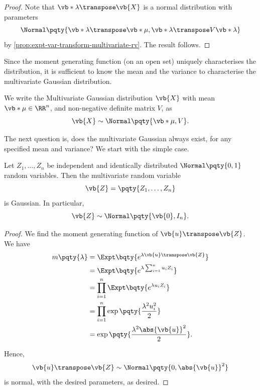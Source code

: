\begin{proof}
    Note that \(\vb*{\lambda \transpose \vb{X}}\) is a normal distribution with parameters
    \[
        \Normal\pqty{\vb*{\lambda}\transpose\vb*{\mu}, \vb*{\lambda}\transpose V \vb*{\lambda}}
    \]
    by \autoref{prop:expt-var-transform-multivariate-rv}. The result follows.
\end{proof}

Since the moment generating function (on an open set) uniquely characterises the distribution, it is sufficient to know the mean and the variance to characterise the multivariate Gaussian distribution.

\begin{notation}
    We write the Multivariate Gaussian distribution \(\vb{X}\) with mean \(\vb*{\mu} \in \RR^n\), and non-negative definite matrix \(V\), as
    \[
        \vb{X} \sim \Normal\pqty{\vb*{\mu}, V}.
    \]
\end{notation}

The next question is, does the multivariate Gaussian always exist, for any specified mean and variance? We start with the simple case. 

\begin{lemma}
    \label{lem:standard-normal-multivariate-gaussian}%
    Let \(Z_1, \ldots, Z_n\) be independent and identically distributed \(\Normal\pqty{0, 1}\) random variables. Then the multivariate random variable
    \[
        \vb{Z} = \pqty{Z_1, \ldots, Z_n}
    \]
    is Gaussian. In particular,
    \[
        \vb{Z} \sim \Normal\pqty{\vb{0}, I_n}.
    \]
\end{lemma}

\begin{proof}
    We find the moment generating function of \(\vb{u} \transpose \vb{Z}\). We have
    \begin{align*}
        m\pqty{\lambda} &= \Expt\bqty{e^{\lambda \vb{u}\transpose \vb{Z}}} \\
        &= \Expt\bqty{e^{\lambda \sum_{i = 1}^{n} u_i Z_i}} \\
        &= \prod_{i = 1}^{n} \Expt\bqty{e^{\lambda u_i Z_i}} \\
        &= \prod_{i = 1}^{n} \exp\pqty{\frac{\lambda^2 u_i^2}{2}} \\
        &= \exp\pqty{\frac{\lambda^2 \abs{\vb{u}}^2}{2}}.
    \end{align*}

    Hence,
    \[
        \vb{u}\transpose \vb{Z} \sim \Normal \pqty{0, \abs{\vb{u}}^2}
    \]
    is normal, with the desired parameters, as desired.
\end{proof}

